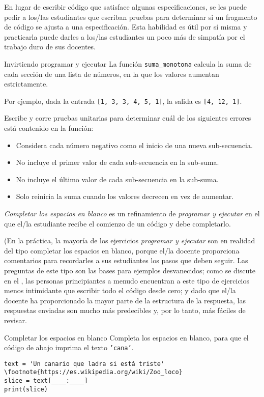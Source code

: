 En lugar de escribir código que satisface algunas especificaciones,  
se les puede pedir a los/las estudiantes que escriban pruebas para determinar si un fragmento de código se ajusta a una especificación. 
Esta habilidad es útil por sí misma y practicarla puede darles a los/las estudiantes un poco más de simpatía por el trabajo duro de sus docentes.

\begin{aside}{Invirtiendo programar y ejecutar}
 La función \texttt{suma\_monotona} calcula la suma de cada sección de una lista de números, en la que los valores aumentan estrictamente.

Por ejemplo,
  dada la entrada \texttt{[1,\ 3,\ 3,\ 4,\ 5,\ 1]},
  la salida es  \texttt{[4,\ 12,\ 1]}.

Escribe y corre pruebas unitarias para determinar cuál de los siguientes errores está contenido en la función:

   \begin{itemize}
  \item
    Considera cada número negativo como el inicio de una nueva sub-secuencia.
  \item
    No incluye el primer valor de cada sub-secuencia en la sub-suma.
  \item
    No incluye el último valor de cada sub-secuencia en la sub-suma.
  \item
    Solo reinicia la suma cuando los valores decrecen en vez de aumentar.
  \end{itemize}
\end{aside}


\emph{Completar los espacios en blanco} es un refinamiento de \emph{programar y ejecutar}
en el que el/la estudiante recibe el comienzo de un código y debe completarlo.

(En la práctica, la mayoría de los ejercicios \emph{programar y ejecutar} son en realidad del tipo completar los espacios en blanco, porque el/la docente proporciona comentarios
para recordarles a sus estudiantes los pasos que deben seguir. 
Las preguntas de este tipo son las bases para ejemplos desvanecidos;
como se discute en el ,
las personas principiantes a menudo encuentran a este tipo de ejercicios  menos intimidante que escribir todo el código desde cero;
y dado que el/la docente ha proporcionado la mayor parte de la estructura de la respuesta,
las respuestas enviadas son mucho más predecibles y, por lo tanto, más fáciles de revisar.

\begin{aside}{Completar los espacios en blanco}
 Completa los espacios en blanco,
 para que el código de abajo imprima el texto  \texttt{'cana'}.

\begin{verbatim}
text = 'Un canario que ladra si está triste' \footnote{https://es.wikipedia.org/wiki/Zoo_loco}
slice = text[____:____]
print(slice)
\end{verbatim}
\end{aside}

